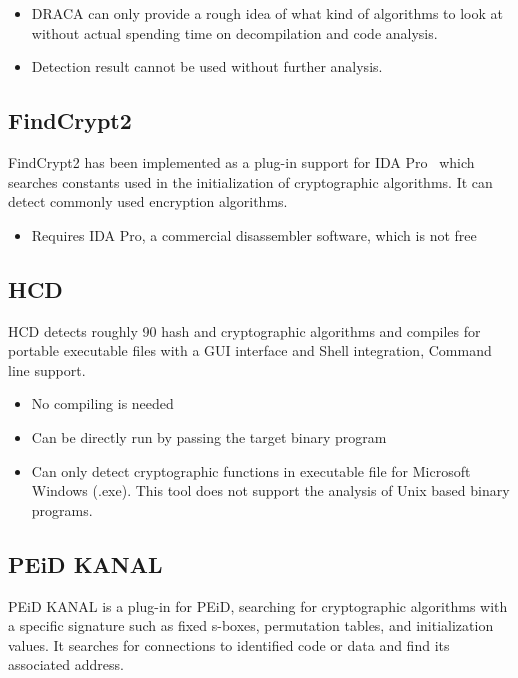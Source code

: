 \begin{itemize}
  \item DRACA can only provide a rough idea of what kind of algorithms to look at without actual spending time on decompilation and code analysis.
  \item Detection result cannot be used without further analysis.
\end{itemize}


\subsection{FindCrypt2} 
 FindCrypt2 \cite{findcrypt2} has been implemented as a plug-in support for IDA Pro~\cite{IDA_pro} which searches constants used in the initialization of cryptographic algorithms. It can detect commonly used encryption algorithms.

\begin{itemize}
  \item Requires IDA Pro, a commercial disassembler software, which is not free
\end{itemize}


\subsection{HCD} 
 HCD \cite{hcd} detects roughly 90 hash and cryptographic algorithms and compiles for portable executable files with a GUI interface and Shell integration, Command line support.

\begin{itemize}
  \item No compiling is needed
  \item Can be directly run by passing the target binary program
\end{itemize}

\begin{itemize}
    \item Can only detect cryptographic functions in executable file for Microsoft Windows (.exe). This tool does not support the analysis of Unix based binary programs.
\end{itemize}

\subsection{PEiD KANAL} 
 PEiD KANAL \cite{kanal} is a plug-in for PEiD, searching for cryptographic algorithms with a specific signature such as fixed s-boxes, permutation tables, and initialization values. It searches for connections to identified code or data and find its associated address.

